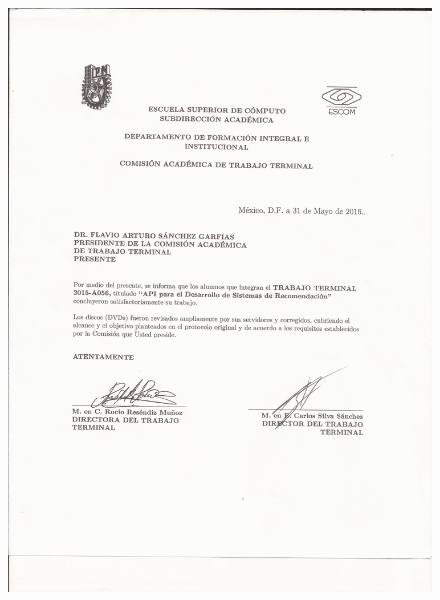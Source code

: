 \begin{figure}[h!]
        \centering
        \includegraphics[width=16cm]{./images/carta}
        
      \end{figure}

      
  